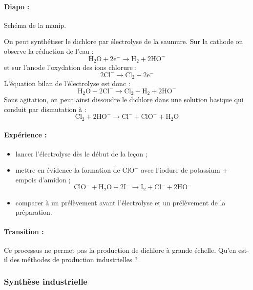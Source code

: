 \paragraph{Diapo : } Schéma de la manip.

On peut synthétiser le dichlore par électrolyse de la saumure.
Sur la cathode on observe la réduction de l'eau :
\begin{equation*}
\mathrm{H_2O + 2e^- \rightarrow H_2 + 2HO^-}
\end{equation*}
et sur l'anode l'oxydation des ions chlorure :
\begin{equation*}
\mathrm{2Cl^- \rightarrow Cl_2 + 2e^-}
\end{equation*}
L'équation bilan de l'électrolyse est donc :
\begin{equation*}
\mathrm{H_2O + 2Cl^- \rightarrow Cl_2 + H_2 + 2HO^-}
\end{equation*}
Sous agitation, on peut ainsi dissoudre le dichlore dans une solution basique qui conduit par dismutation à :
\begin{equation*}
\mathrm{Cl_2 + 2HO^- \rightarrow Cl^- + ClO^- + H_2O} 
\end{equation*}

\paragraph{Expérience : }
\begin{itemize}
\item lancer l'électrolyse dès le début de la leçon ;
\item mettre en évidence la formation de $\mathrm{ClO^-}$ avec l'iodure de potassium + empois d'amidon ;
\begin{equation*}
\mathrm{ClO^- + H_2O + 2I^- \rightarrow I_2 + Cl^- + 2HO^-} 
\end{equation*}
\item comparer à un prélèvement avant l'électrolyse et un prélèvement de la préparation.
\end{itemize}

\paragraph{Transition : } Ce processus ne permet pas la production de dichlore à grande échelle.
Qu'en est-il des méthodes de production industrielles ?

\subsubsection{Synthèse industrielle}

